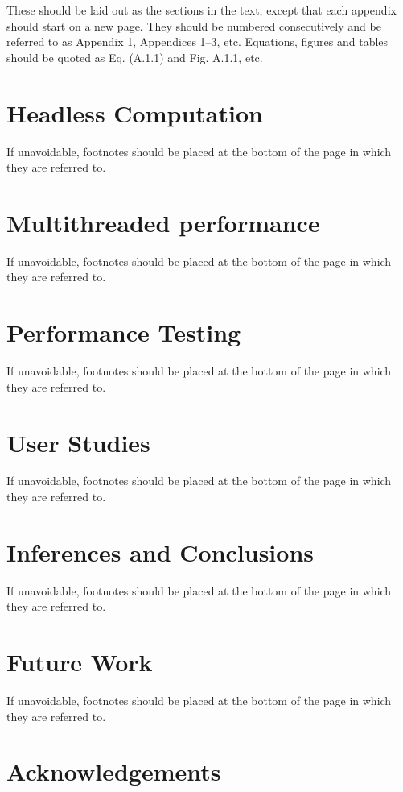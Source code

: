 \documentclass[aps,prb,twocolumn,superscriptaddress,floatfix,longbibliography]{revtex4-2}
\begin{document}
These should be laid out as the sections in the text,
except that each appendix should start on a new page.
They should be numbered consecutively and be referred
to as Appendix 1, Appendices 1--3, etc. 
Equations, figures and tables should be
quoted as Eq. (A.1.1) and Fig. A.1.1, etc.  

\section{Headless Computation}

If unavoidable, footnotes should be placed at the bottom
of the page in which they are referred to.

\section{Multithreaded performance}

If unavoidable, footnotes should be placed at the bottom
of the page in which they are referred to.

\section{Performance Testing}

If unavoidable, footnotes should be placed at the bottom
of the page in which they are referred to.

\section{User Studies}

If unavoidable, footnotes should be placed at the bottom
of the page in which they are referred to.

\section{Inferences and Conclusions}

If unavoidable, footnotes should be placed at the bottom
of the page in which they are referred to.

\section{Future Work}

If unavoidable, footnotes should be placed at the bottom
of the page in which they are referred to.

\section*{Acknowledgements}
\end{document}
